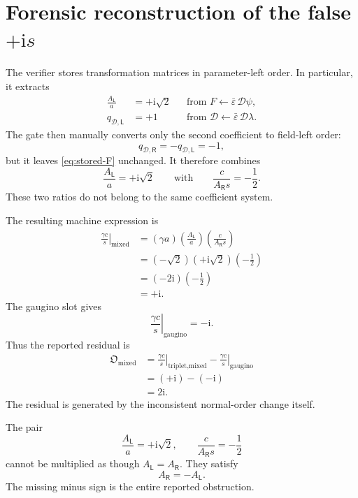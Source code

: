 \documentclass[11pt,a4paper,UTF8]{ctexart}
\numberwithin{equation}{section}
\newcommand{\ii}{\mathrm i}
\newcommand{\cD}{\mathcal D}
\newcommand{\eps}{\varepsilon}
\newcommand{\PL}{\mathsf L}
\newcommand{\PR}{\mathsf R}
\begin{document}
\section{Forensic reconstruction of the false $+\ii s$}

The verifier stores transformation matrices in parameter-left order. In particular, it extracts
\begin{align}
\frac{A_{\PL}}{a}&=+\ii\sqrt2
&&\text{from }F\leftarrow\bar\eps\,\cD\psi,
\label{eq:stored-F}
\\
q_{\mathscr D,\PL}&=+1
&&\text{from }\mathscr D\leftarrow\bar\eps\,\cD\lambda.
\label{eq:stored-D}
\end{align}
The gate then manually converts only the second coefficient to field-left order:
\begin{equation}
q_{\mathscr D,\PR}=-q_{\mathscr D,\PL}=-1,
\label{eq:D-converted}
\end{equation}
but it leaves \cref{eq:stored-F} unchanged. It therefore combines
\[
\frac{A_{\PL}}a=+\ii\sqrt2
\qquad\text{with}\qquad
\frac{c}{A_{\PR}s}=-\frac12.
\]
These two ratios do not belong to the same coefficient system.

The resulting machine expression is
\begin{align}
\left.\frac{\gamma c}{s}\right|_{\text{mixed}}
&=(\gamma a)
\left(\frac{A_{\PL}}a\right)
\left(\frac{c}{A_{\PR}s}\right)
\\
&=(-\sqrt2)(+\ii\sqrt2)\left(-\frac12\right)
\\
&=(-2\ii)\left(-\frac12\right)
\\
&=+\ii.
\label{eq:false-plus-i}
\end{align}
The gaugino slot gives
\[
\left.\frac{\gamma c}{s}\right|_{\text{gaugino}}=-\ii.
\]
Thus the reported residual is
\begin{align}
\mathfrak O_{\text{mixed}}
&=\left.\frac{\gamma c}{s}\right|_{\text{triplet,mixed}}
-
\left.\frac{\gamma c}{s}\right|_{\text{gaugino}}
\\
&=(+\ii)-(-\ii)
\\
&=2\ii.
\end{align}
The residual is generated by the inconsistent normal-order change itself.

\begin{warningbox}
The pair
\[
\frac{A_{\PL}}a=+\ii\sqrt2,
\qquad
\frac{c}{A_{\PR}s}=-\frac12
\]
cannot be multiplied as though $A_{\PL}=A_{\PR}$. They satisfy
\[
A_{\PR}=-A_{\PL}.
\]
The missing minus sign is the entire reported obstruction.
\end{warningbox}
\end{document}
